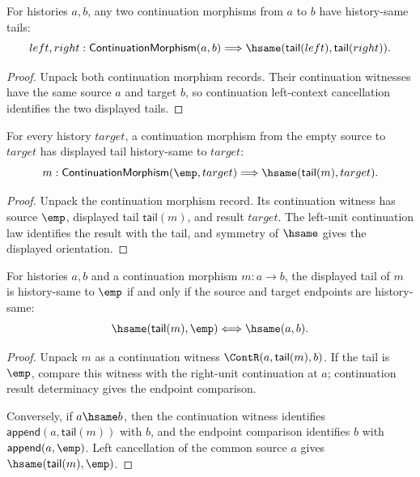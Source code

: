 \begin{theorem}
\label{thm:continuation-morphism-tail-deterministic}
For histories $a,b$, any two continuation morphisms from $a$ to $b$ have
history-same tails:
$$
left,right:\mathsf{ContinuationMorphism}(a,b)
\Longrightarrow
\hsame(\mathsf{tail}(left),\mathsf{tail}(right)).
$$
\end{theorem}
\begin{proof}
Unpack both continuation morphism records. Their continuation witnesses have
the same source $a$ and target $b$, so continuation left-context cancellation
identifies the two displayed tails.
\end{proof}

\begin{theorem}
\label{thm:continuation-morphism-empty-source-tail-target-hsame}
For every history $target$, a continuation morphism from the empty source to
$target$ has displayed tail history-same to $target$:
$$
m:\mathsf{ContinuationMorphism}(\emp,target)
\Longrightarrow
\hsame(\mathsf{tail}(m),target).
$$
\end{theorem}
\begin{proof}
Unpack the continuation morphism record. Its continuation witness has source
$\emp$, displayed tail $\mathsf{tail}(m)$, and result $target$. The left-unit
continuation law identifies the result with the tail, and symmetry of
$\hsame$ gives the displayed orientation.
\end{proof}

\begin{theorem}
\label{thm:continuation-morphism-tail-empty-endpoint-hsame-iff}
For histories $a,b$ and a continuation morphism $m:a\to b$, the displayed tail
of $m$ is history-same to $\emp$ if and only if the source and target endpoints
are history-same:
$$
\hsame(\mathsf{tail}(m),\emp)
\Longleftrightarrow
\hsame(a,b).
$$
\end{theorem}
\begin{proof}
Unpack $m$ as a continuation witness $\ContR(a,\mathsf{tail}(m),b)$. If the
tail is $\emp$, compare this witness with the right-unit continuation at $a$;
continuation result determinacy gives the endpoint comparison.

Conversely, if $a\hsame b$, then the continuation witness identifies
$\mathsf{append}(a,\mathsf{tail}(m))$ with $b$, and the endpoint comparison
identifies $b$ with $\mathsf{append}(a,\emp)$. Left cancellation of the common
source $a$ gives $\hsame(\mathsf{tail}(m),\emp)$.
\end{proof}

